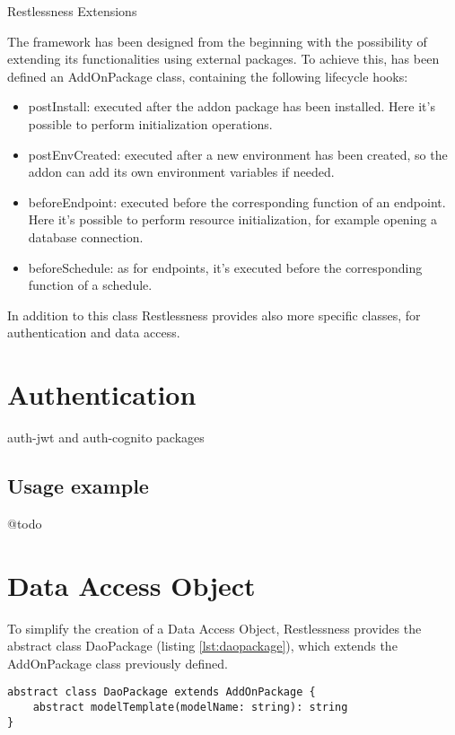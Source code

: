\begin{chapter}{Restlessness Extensions}
    \label{chap:extensions}

    The framework has been designed from the beginning with the possibility of
    extending its functionalities using external packages.
    To achieve this, has been defined an AddOnPackage class, containing the
    following lifecycle hooks:
    \begin{itemize}
        \item postInstall: executed after the addon package has been installed.
            Here it's possible to perform initialization operations.
        \item postEnvCreated: executed after a new environment has been created,
            so the addon can add its own environment variables if needed.
        \item beforeEndpoint: executed before the corresponding function of an
            endpoint. Here it's possible to perform resource initialization,
            for example opening a database connection.
        \item beforeSchedule: as for endpoints, it's executed before the
            corresponding function of a schedule.
    \end{itemize}

    In addition to this class Restlessness provides also more specific classes,
    for authentication and data access.

    \section{Authentication}
    auth-jwt and auth-cognito packages

    \subsection{Usage example}
    @todo

    \section{Data Access Object}
    \label{sec:data_access_object}

    To simplify the creation of a Data Access Object, Restlessness provides the
    abstract class DaoPackage (listing \ref{lst:daopackage}), which extends the
    AddOnPackage class previously defined.

    \begin{lstlisting}[caption=DaoPackage class definition, label={lst:daopackage}]
abstract class DaoPackage extends AddOnPackage {
    abstract modelTemplate(modelName: string): string
}
    \end{lstlisting}


\end{chapter}
